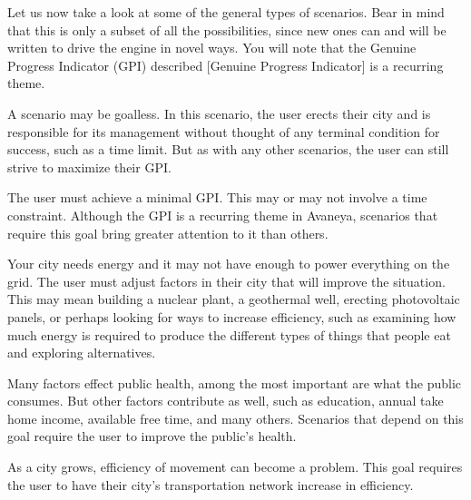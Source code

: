 Let us now take a look at some of the general types of scenarios. Bear in mind that this is only a subset of all the possibilities, since new ones can and will be written to drive the engine in novel ways. You will note that the Genuine Progress Indicator (GPI) described [Genuine Progress Indicator] is a recurring theme.

\startitemize[4]

A scenario may be goalless. In this scenario, the user erects their city and is responsible for its management without thought of any terminal condition for success, such as a time limit. But as with any other scenarios, the user can still strive to maximize their GPI.


The user must achieve a minimal GPI. This may or may not involve a time constraint. Although the GPI is a recurring theme in Avaneya, scenarios that require this goal bring greater attention to it than others.




Your city needs energy and it may not have enough to power everything on the grid. The user must adjust factors in their city that will improve the situation. This may mean building a nuclear plant, a geothermal well, erecting photovoltaic panels, or perhaps looking for ways to increase efficiency, such as examining how much energy is required to produce the different types of things that people eat and exploring alternatives.


Many factors effect public health, among the most important are what the public consumes. But other factors contribute as well, such as education, annual take home income, available free time, and many others. Scenarios that depend on this goal require the user to improve the public's health.


As a city grows, efficiency of movement can become a problem. This goal requires the user to have their city's transportation network increase in efficiency.



